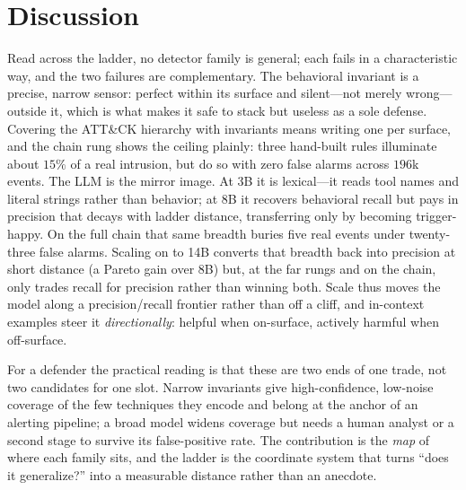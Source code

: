 \documentclass[sigconf,nonacm]{acmart}
\begin{document}
\section{Discussion}
\label{sec:discussion}
Read across the ladder, no detector family is general; each fails in a
characteristic way, and the two failures are complementary. The behavioral
invariant is a precise, narrow sensor: perfect within its surface and
silent---not merely wrong---outside it, which is what makes it safe to stack but
useless as a sole defense. Covering the ATT\&CK hierarchy with invariants means
writing one per surface, and the chain rung shows the ceiling plainly: three
hand-built rules illuminate about $15\%$ of a real intrusion, but do so with zero
false alarms across $196$k events. The LLM is the mirror image. At 3B it is
lexical---it reads tool names and literal strings rather than behavior; at 8B it
recovers behavioral recall but pays in precision that decays with ladder
distance, transferring only by becoming trigger-happy. On the full chain that
same breadth buries five real events under twenty-three false alarms. Scaling on
to 14B converts that breadth back into precision at short distance (a Pareto gain
over 8B) but, at the far rungs and on the chain, only trades recall for precision
rather than winning both. Scale thus moves the model along a precision/recall
frontier rather than off a cliff, and in-context examples steer it
\emph{directionally}: helpful when on-surface, actively harmful when off-surface.

For a defender the practical reading is that these are two ends of one trade, not
two candidates for one slot. Narrow invariants give high-confidence, low-noise
coverage of the few techniques they encode and belong at the anchor of an
alerting pipeline; a broad model widens coverage but needs a human analyst or a
second stage to survive its false-positive rate. The contribution is the
\emph{map} of where each family sits, and the ladder is the coordinate system
that turns ``does it generalize?'' into a measurable distance rather than an
anecdote.
\end{document}
